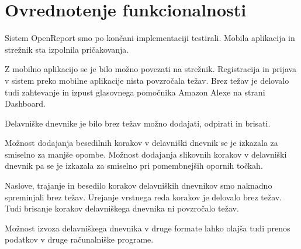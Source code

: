 \documentclass[a4paper, 12pt]{book}
\begin{document}



\section{Ovrednotenje funkcionalnosti}


Sistem OpenReport smo po končani implementaciji testirali. 
Mobila aplikacija in strežnik sta izpolnila pričakovanja.

Z mobilno aplikacijo se je bilo možno povezati na strežnik.
Registracija in prijava v sistem preko mobilne aplikacije nista povzročala težav.
Brez težav je delovalo tudi zahtevanje in izpust glasovnega pomočnika Amazon Alexe na strani Dashboard.

Delavniške dnevnike je bilo brez težav možno dodajati, odpirati in brisati.

Možnost dodajanja besedilnih korakov v delavniški dnevnik se je izkazala za smiselno za manjše opombe.
Možnost dodajanja slikovnih korakov v delavniški dnevnik pa se je izkazala za smiselno pri pomembnejših opornih točkah.

Naslove, trajanje in besedilo korakov delavniških dnevnikov smo naknadno spreminjali brez težav.
Urejanje vrstnega reda korakov je delovalo brez težav.
Tudi brisanje korakov delavniškega dnevnika ni povzročalo težav.

Možnost izvoza delavniškega dnevnika v druge formate lahko olajša tudi prenos podatkov v druge računalniške programe.


\bigbreak
\end{document}
